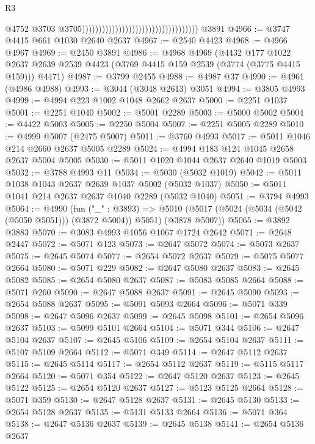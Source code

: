 \begin{lexlean}{R3}
\begin{coremodule}
                                                                          @4752
                                                                          @3703
                                                                          @3705)))))))))))))))))))))))))))))))))))
    @3891
@4966 := @3747 @4415 @661 @1030 @2640 @2637
@4967 := @2540 @4423
@4968 := @4966 @4967
@4969 := @2450 @3891
@4986 := @4968
    @4969
    (@4432
      @177
      @1022
      @2637
      @2639
      @2539
      @4423
      (@3769 @4415 @159 @2539 (@3774 (@3775 @4415 @159)))
      @4471)
@4987 := @3799 @2455
@4988 := @4987 @37
@4990 := @4961 (@4986 @4988)
@4993 := @3044 (@3048 @2613) @3051
@4994 := @3805 @4993
@4999 := @4994 @223 @1002 @1048 @2662 @2637
@5000 := @2251 @1037
@5001 := @2251 @1040
@5002 := @5001 @2289
@5003 := @5000 @5002
@5004 := @4422 @5003
@5005 := @2250 @5004
@5007 := @2251 @5005 @2289
@5010 := @4999 @5007 (@2475 @5007)
@5011 := @3760 @4993
@5017 := @5011 @1046 @214 @2660 @2637 @5005 @2289
@5024 := @4994 @183 @124 @1045 @2658 @2637 @5004 @5005
@5030 := @5011 @1020 @1044 @2637 @2640 @1019 @5003
@5032 := @3788 @4993 @11
@5034 := @5030 (@5032 @1019)
@5042 := @5011 @1038 @1043 @2637 @2639 @1037 @5002 (@5032 @1037)
@5050 := @5011 @1041 @214 @2637 @2637 @1040 @2289 (@5032 @1040)
@5051 := @3794 @4993
@5064 := @4990
    (fun ("_" : @3893) =>
    @5010 (@5017 (@5024 (@5034 (@5042 (@5050 @5051))) (@3872 @5004)) @5051) (@3878 @5007))
@5065 := @3892 @3883
@5070 := @3083 @4993 @1056 @1067 @1724 @2642
@5071 := @2648 @2447
@5072 := @5071 @123
@5073 := @2647 @5072
@5074 := @5073 @2637
@5075 := @2645 @5074
@5077 := @2654 @5072 @2637
@5079 := @5075 @5077 @2664
@5080 := @5071 @229
@5082 := @2647 @5080 @2637
@5083 := @2645 @5082
@5085 := @2654 @5080 @2637
@5087 := @5083 @5085 @2664
@5088 := @5071 @260
@5090 := @2647 @5088 @2637
@5091 := @2645 @5090
@5093 := @2654 @5088 @2637
@5095 := @5091 @5093 @2664
@5096 := @5071 @339
@5098 := @2647 @5096 @2637
@5099 := @2645 @5098
@5101 := @2654 @5096 @2637
@5103 := @5099 @5101 @2664
@5104 := @5071 @344
@5106 := @2647 @5104 @2637
@5107 := @2645 @5106
@5109 := @2654 @5104 @2637
@5111 := @5107 @5109 @2664
@5112 := @5071 @349
@5114 := @2647 @5112 @2637
@5115 := @2645 @5114
@5117 := @2654 @5112 @2637
@5119 := @5115 @5117 @2664
@5120 := @5071 @354
@5122 := @2647 @5120 @2637
@5123 := @2645 @5122
@5125 := @2654 @5120 @2637
@5127 := @5123 @5125 @2664
@5128 := @5071 @359
@5130 := @2647 @5128 @2637
@5131 := @2645 @5130
@5133 := @2654 @5128 @2637
@5135 := @5131 @5133 @2664
@5136 := @5071 @364
@5138 := @2647 @5136 @2637
@5139 := @2645 @5138
@5141 := @2654 @5136 @2637

\end{coremodule}
\end{lexlean}
